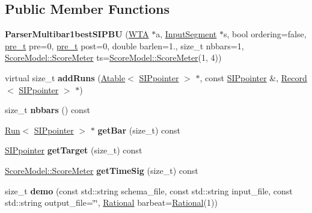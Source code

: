 \subsection*{Public Member Functions}
\begin{DoxyCompactItemize}
\item 
\mbox{\label{classParserMultibar1bestSIPBU_ac1f965b7c1942498238c55860663fb52}} 
{\bfseries Parser\+Multibar1best\+S\+I\+P\+BU} (\mbox{\hyperlink{classWTA}{W\+TA}} $\ast$a, \mbox{\hyperlink{classInputSegment}{Input\+Segment}} $\ast$s, bool ordering=false, \mbox{\hyperlink{group__general_ga092fe8b972dfa977c2a0886720a7731e}{pre\+\_\+t}} pre=0, \mbox{\hyperlink{group__general_ga092fe8b972dfa977c2a0886720a7731e}{pre\+\_\+t}} post=0, double barlen=1., size\+\_\+t nbbars=1, \mbox{\hyperlink{classScoreModel_1_1ScoreMeter}{Score\+Model\+::\+Score\+Meter}} ts=\mbox{\hyperlink{classScoreModel_1_1ScoreMeter}{Score\+Model\+::\+Score\+Meter}}(1, 4))
\item 
\mbox{\label{classParserMultibar1bestSIPBU_ad6c61de9398ec0c64254dc633db6ecbd}} 
virtual size\+\_\+t {\bfseries add\+Runs} (\mbox{\hyperlink{classAtable}{Atable}}$<$ \mbox{\hyperlink{classSIPpointer}{S\+I\+Ppointer}} $>$ $\ast$, const \mbox{\hyperlink{classSIPpointer}{S\+I\+Ppointer}} \&, \mbox{\hyperlink{classRecord}{Record}}$<$ \mbox{\hyperlink{classSIPpointer}{S\+I\+Ppointer}} $>$ $\ast$)
\item 
\mbox{\label{classParserMultibar1bestSIPBU_a5ec8c2d61fd092472cf3c6853f82eb43}} 
size\+\_\+t {\bfseries nbbars} () const
\item 
\mbox{\label{classParserMultibar1bestSIPBU_a040ba191a5b1db34162b86ffcbad0aa0}} 
\mbox{\hyperlink{classRun}{Run}}$<$ \mbox{\hyperlink{classSIPpointer}{S\+I\+Ppointer}} $>$ $\ast$ {\bfseries get\+Bar} (size\+\_\+t) const
\item 
\mbox{\label{classParserMultibar1bestSIPBU_ae2f23be589b5c770f7ab568da9fa81f1}} 
\mbox{\hyperlink{classSIPpointer}{S\+I\+Ppointer}} {\bfseries get\+Target} (size\+\_\+t) const
\item 
\mbox{\label{classParserMultibar1bestSIPBU_a29c49331e13bb2e57c8c2c36dab05512}} 
\mbox{\hyperlink{classScoreModel_1_1ScoreMeter}{Score\+Model\+::\+Score\+Meter}} {\bfseries get\+Time\+Sig} (size\+\_\+t) const
\item 
\mbox{\label{classParserMultibar1bestSIPBU_abbbc79c23cdbb9445a7df6807a768a96}} 
size\+\_\+t {\bfseries demo} (const std\+::string schema\+\_\+file, const std\+::string input\+\_\+file, const std\+::string output\+\_\+file=\char`\"{}\char`\"{}, \mbox{\hyperlink{classRational}{Rational}} barbeat=\mbox{\hyperlink{classRational}{Rational}}(1))
\end{DoxyCompactItemize}
